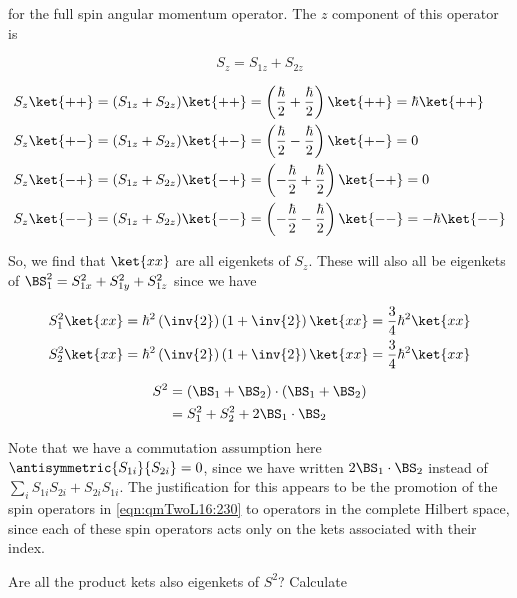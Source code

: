for the full spin angular momentum operator.  The $z$ component of this operator is 

\begin{equation}\label{eqn:qmTwoL16:290}
S_z = S_{1z} + S_{2z}
\end{equation}

\begin{align}\label{eqn:qmTwoL16:310}
S_z\ket{++} &= (S_{1z} + S_{2z}) \ket{++} = \left( \frac{\hbar}{2} +\frac{\hbar}{2} \right) \ket{++} = \hbar \ket{++} \\ 
S_z\ket{+-} &= (S_{1z} + S_{2z}) \ket{+-} = \left( \frac{\hbar}{2} -\frac{\hbar}{2} \right) \ket{+-} = 0 \\
S_z\ket{-+} &= (S_{1z} + S_{2z}) \ket{-+} = \left( -\frac{\hbar}{2} +\frac{\hbar}{2} \right) \ket{-+} = 0 \\
S_z\ket{--} &= (S_{1z} + S_{2z}) \ket{--} = \left( -\frac{\hbar}{2} -\frac{\hbar}{2} \right) \ket{--} = -\hbar \ket{--} 
\end{align}

So, we find that $\ket{x x}$ are all eigenkets of $S_z$.  These will also all be eigenkets of $\BS_1^2 = S_{1x}^2 +S_{1y}^2 +S_{1z}^2$ since we have

\begin{align}\label{eqn:qmTwoL16:330}
S_1^2 \ket{x x} &= \hbar^2 \left(\inv{2}\right) \left(1 + \inv{2}\right) \ket{x x} = \frac{3}{4} \hbar^2 \ket{x x} \\
S_2^2 \ket{x x} &= \hbar^2 \left(\inv{2}\right) \left(1 + \inv{2}\right) \ket{x x} = \frac{3}{4} \hbar^2 \ket{x x} 
\end{align}

\begin{equation}\label{eqn:qmTwoL16:350}
\begin{aligned}
S^2 &= 
(\BS_1
+\BS_2) 
\cdot
(\BS_1
+\BS_2)  \\
&= 
S_1^2 + S_2^2 + 2 \BS_1 \cdot \BS_2
\end{aligned}
\end{equation}

Note that we have a commutation assumption here $\antisymmetric{S_{1i}}{S_{2i}} = 0$, since we have written $2 \BS_1 \cdot \BS_2$ instead of $\sum_i S_{1i}S_{2i} + S_{2i}S_{1i}$.  The justification for this appears to be the promotion of the spin operators in \ref{eqn:qmTwoL16:230} to operators in the complete Hilbert space, since each of these spin operators acts only on the kets associated with their index.

Are all the product kets also eigenkets of $S^2$?  Calculate

